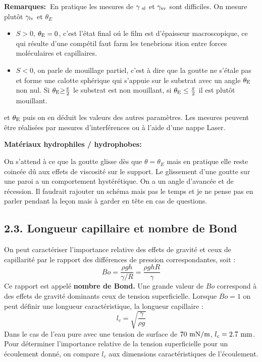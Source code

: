 \documentclass[french, a4paper, 10pt, twocolumn, landscape]{article}
\begin{document}
\textbf{Remarques:~}En pratique les mesures de $\gamma_{\rm~{sl}}$ et
$\gamma_{\rm sv}$ sont difficiles. On mesure plutôt $\gamma_{\rm lv}$
et $\theta_E$
\begin{itemize}
\item $S > 0$, $\theta_{\rm E}=0$, c'est l'{\'e}tat final o{\'u} le film
est d'{\'e}paisseur macroscopique, ce qui r{\'e}sulte d'une comp{\'e}til faut farm les tenebrions ition
entre forces mol{\'e}culaires et capillaires.

\item $S < 0$, on parle de mouillage partiel, c'est {\`a} dire que la
goutte ne s'{\'e}tale pas et forme une calotte sph{\'e}rique qui s'appuie sur
le substrat avec un angle $\theta_{\rm E}$ non nul. Si
$\theta_{\rm E}{\geq} \frac{\pi}{2}$ le substrat est non mouillant, si
$\theta_{\rm E} \leq \frac{\pi}{2}$ il est plutôt mouillant.
\end{itemize}

et $\theta_{\rm E}$ puis on en d{\'e}duit les valeurs des autres
param{\`e}tres. Les mesures peuvent {\^e}tre r{\'e}alis{\'e}es par mesures
d'interf{\'e}rences ou {\`a} l'aide d'une nappe Laser.\medskip

\textbf{Mat{\'e}riaux hydrophiles / hydrophobes:}


On s'attend {\`a} ce que la goutte glisse d{\`e}s que
$\theta=\theta_{E}$ mais en pratique elle reste coinc{\'e}e
d{\^u} aux effets de viscosit{\'e} sur le support. Le glissement d'une goutte
sur une paroi a un comportement hyst{\'e}r{\'e}tique. On a un angle
d'avanc{\'e}e et de r{\'e}cession. Il faudrait rajouter un sch{\'e}ma mais pas
le temps et je ne pense pas en parler pendant la le{\c c}on mais {\`a} garder
en t{\^e}te en cas de questions.

\subsection*{2.3. Longueur capillaire et nombre de Bond}

On peut caract{\'e}riser l'importance relative des effets de gravit{\'e} et
ceux de capillarit{\'e} par le rapport des diff{\'e}rences de pression
correspondantes, soit :
\begin{equation}
  B o = \dfrac{\rho g h}{\gamma / R} = \dfrac{\rho g h R}{\gamma}
\end{equation}
Ce rapport est appel{\'e} \textbf{nombre de Bond.} Une grande valeur de $B
o$ correspond {\`a} des effets de gravit{\'e} dominants ceux de tension
superficielle. Lorsque $B o = 1$ on peut d{\'e}finir une longueur
caract{\'e}ristique, la longueur capillaire :
\begin{equation}
  l_c = \sqrt{\dfrac{\gamma}{\rho g}}
\end{equation}
Dans le cas de l'eau pure avec une tension de surface de $70~ \rm mN/m$, $l_c = 2.7\rm~{mm}$. Pour d{\'e}terminer l'importance relative de la tension superficielle pour un {\'e}coulement donn{\'e}, on compare $l_c$ aux dimensions caract{\'e}ristiques de l'{\'e}coulement.
\end{document}
